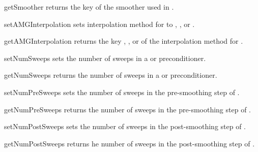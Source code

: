 \begin{methoddesc}[SolverOptions]{getSmoother}{}
returns the key of the smoother used in \AMG.
\end{methoddesc}

\begin{methoddesc}[SolverOptions]{setAMGInterpolation}{}
sets interpolation method for \AMG to
,
, or
.
\end{methoddesc}

\begin{methoddesc}[SolverOptions]{getAMGInterpolation}{}
returns the key 
,
, or
of the interpolation method for \AMG.
\end{methoddesc}

\begin{methoddesc}[SolverOptions]{setNumSweeps}{}
sets the number of sweeps in a \JACOBI or \GAUSSSEIDEL preconditioner.
\end{methoddesc}

\begin{methoddesc}[SolverOptions]{getNumSweeps}{}
returns the number of sweeps in a \JACOBI or \GAUSSSEIDEL preconditioner.
\end{methoddesc}



\begin{methoddesc}[SolverOptions]{setNumPreSweeps}{}
sets the number of sweeps in the pre-smoothing step of \AMG.
\end{methoddesc}

\begin{methoddesc}[SolverOptions]{getNumPreSweeps}{}
returns the number of sweeps in the pre-smoothing step of \AMG.
\end{methoddesc}

\begin{methoddesc}[SolverOptions]{setNumPostSweeps}{}
sets the number of sweeps in the post-smoothing step of \AMG.
\end{methoddesc}

\begin{methoddesc}[SolverOptions]{getNumPostSweeps}{}
returns he number of sweeps in the post-smoothing step of \AMG.
\end{methoddesc}

